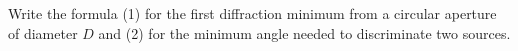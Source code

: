 

\vspace*{\fill}
\centering

Write the formula (1) for the first diffraction minimum from a circular aperture of diameter $D$ and (2) for the minimum angle needed to discriminate two sources.

\centering
\vspace*{\fill}

